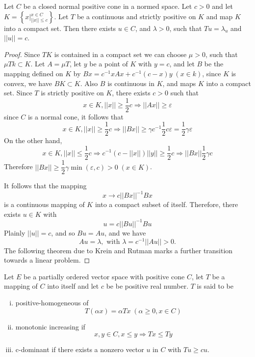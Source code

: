 \begin{thmm}[Schaefer]%
  Let $C$ be a closed normal positive cone in a normed space. Let $c >
  0$ and  let $K = \left\{ x| {}^{x \in C}_{|| x || \leq c }\right\}$. 
  Let $T$ be a 
  continuous and strictly positive on $K$ and map $K$ into a compact
  set. Then there exists $u \in C$, and $\lambda > 0$, such that $Tu =
  \lambda_u $ and $|| u || = c$.  
\end{thmm}

\begin{proof}
  Since $TK$ is contained in a compact set we can choose $\mu  > 0$,
  such that $\mu Tk \subset K$. Let $A = \mu T$, let $y$ be a point of
  $K$ with $y = c$, and let $B$ be the mapping defined on $K$ by $Bx=
  c^{-1} x Ax + c^{-1} (c -x) y \; (x \in k)$, since $K$ is convex, we have
  $BK \subset K$. Also $B$ is continuous in $K$, and maps $K$ into a compact
  set. Since $T$ is strictly positive on $K$, there exists $c > 0$ such
  that  
  $$
  x \in K, || x || \geq \frac{1}{2} c \Rightarrow || Ax || \geq \varepsilon  
  $$\pageoriginale
  since $C$ is a normal cone, it follows that 
  $$
  x \in K, || x || \geq \frac{1}{2} c \Rightarrow ||Bx || \geq \gamma
  c^{-1} \frac{1}{2} c \varepsilon = \frac{1}{2} \gamma \varepsilon  
  $$
  On the other hand,
  $$
  x \in K, || x || \leq \frac{1}{2} c \Rightarrow c^{-1} (c - || x ||)
  || y || \geq \frac{1}{2} c \Rightarrow || Bx || \frac{1}{2} \gamma c  
  $$
  Therefore $|| Bx || \geq \dfrac{1}{2} \gamma \min (\varepsilon, c) >
  0 \; (x \in K)$. 
  
  It follows that the mapping 
  $$
  x \to c || Bx ||^{-1} Bx
  $$ 
  is a continuous mapping of $K$ into a compact subset of
  itself. Therefore, there exists $ u \in K$ with 
  $$
  u = c || Bu ||^{-1} Bu
  $$
  Plainly $|| u || = c$, and so $Bu = Au$, and we have 
  $$
  Au = \lambda, \text{ with } \lambda = c^{-1} || Au || > 0.
  $$%
  The following theorem due to Krein and Rutman \cite[Theorem 9.1]{key20}
  marks a further transition towards a linear problem. 
\end{proof}

\begin{Definition}%
  Let $E$ be a partially ordered vector space with positive cone $C$,
  let $T$ be a mapping of $C$ into itself and let $c$ be be positive
  real number. $T$ is said to be  
  \begin{enumerate}[(i)]
  \item positive-homogeneous of\pageoriginale 
    $$
    T(\alpha x) = \alpha Tx \;  (\alpha \geq 0, x \in C)
    $$

  \item monotonic increasing if 
    $$
    x,y \in C, x \leq y \Rightarrow Tx \leq Ty
    $$
  \item c-dominant if there exists a nonzero vector $u$ in $C$ with
    $Tu \geq cu$. 
  \end{enumerate}
\end{Definition}

